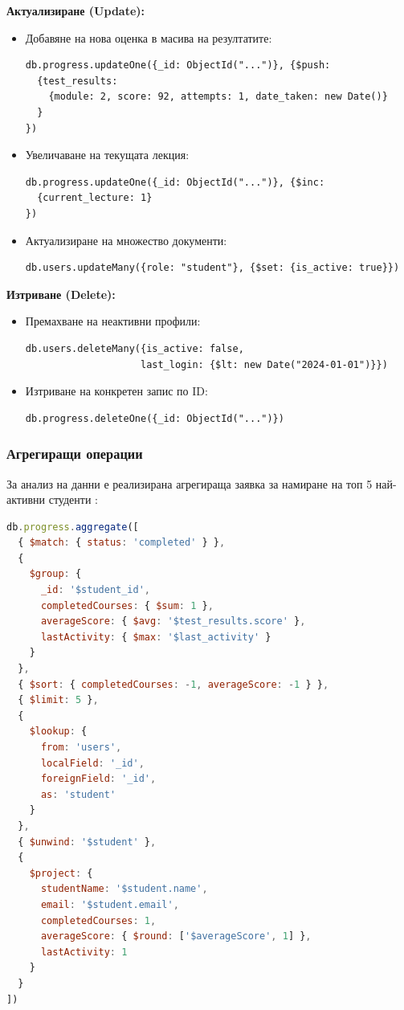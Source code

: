 \textbf{Актуализиране (Update):}
\begin{itemize}
\item Добавяне на нова оценка в масива на резултатите: 
\begin{lstlisting}
db.progress.updateOne({_id: ObjectId("...")}, {$push: 
  {test_results: 
    {module: 2, score: 92, attempts: 1, date_taken: new Date()}
  }
})
\end{lstlisting}
\item Увеличаване на текущата лекция: 
\begin{lstlisting}
db.progress.updateOne({_id: ObjectId("...")}, {$inc: 
  {current_lecture: 1}
})
\end{lstlisting}
\item Актуализиране на множество документи: 
\begin{lstlisting}
db.users.updateMany({role: "student"}, {$set: {is_active: true}})
\end{lstlisting}
\end{itemize}

\textbf{Изтриване (Delete):}
\begin{itemize}
\item Премахване на неактивни профили: 
\begin{lstlisting}
db.users.deleteMany({is_active: false, 
                    last_login: {$lt: new Date("2024-01-01")}})
\end{lstlisting}
\item Изтриване на конкретен запис по ID: 
\begin{lstlisting}
db.progress.deleteOne({_id: ObjectId("...")})
\end{lstlisting}
\end{itemize}

\subsubsection{Агрегиращи операции}

За анализ на данни е реализирана агрегираща заявка за намиране на топ 5 най-активни студенти \cite{mongodb_definitive}:

\begin{lstlisting}[language=JavaScript,caption=Агрегираща заявка за анализ на топ 5 активни студенти]
db.progress.aggregate([
  { $match: { status: 'completed' } },
  {
    $group: {
      _id: '$student_id',
      completedCourses: { $sum: 1 },
      averageScore: { $avg: '$test_results.score' },
      lastActivity: { $max: '$last_activity' }
    }
  },
  { $sort: { completedCourses: -1, averageScore: -1 } },
  { $limit: 5 },
  {
    $lookup: {
      from: 'users',
      localField: '_id',
      foreignField: '_id',
      as: 'student'
    }
  },
  { $unwind: '$student' },
  {
    $project: {
      studentName: '$student.name',
      email: '$student.email',
      completedCourses: 1,
      averageScore: { $round: ['$averageScore', 1] },
      lastActivity: 1
    }
  }
])
\end{lstlisting}

